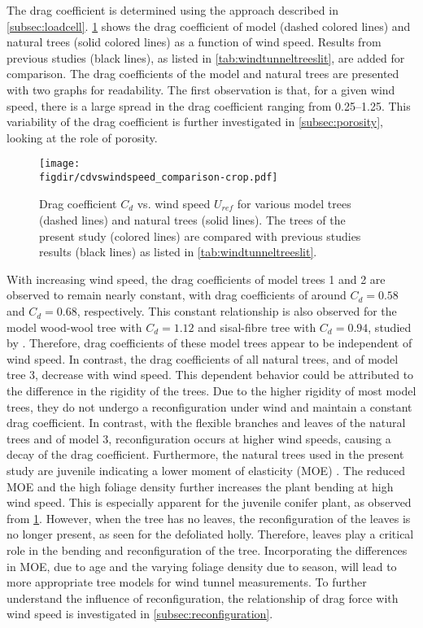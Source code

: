 The drag coefficient is determined using the approach described in \cref{subsec:loadcell}. \cref{fig:cdvswindspeed} shows the drag coefficient of model (dashed colored lines) and natural trees (solid colored lines) as a function of wind speed. Results from previous studies (black lines), as listed in \cref{tab:windtunneltreeslit}, are added for comparison. The drag coefficients of the model and natural trees are presented with two graphs for readability. The first observation is that, for a given wind speed, there is a large spread in the drag coefficient ranging from \numrange{0.25}{1.25}. This variability of the drag coefficient is further investigated in \cref{subsec:porosity}, looking at the role of porosity. 

	\begin{figure}[t]
		\centering
		\texttt{[image: \\figdir/cdvswindspeed\_comparison-crop.pdf]}
		\caption{Drag coefficient $C_d$ vs. wind speed $U_{\textit{ref}}$ for various model trees (dashed lines) and natural trees (solid lines). The trees of the present study (colored lines) are compared with previous studies results (black lines) as listed in \cref{tab:windtunneltreeslit}.}
		\label{fig:cdvswindspeed}
	\end{figure}

With increasing wind speed, the drag coefficients of model trees 1 and 2 are observed to remain nearly constant, with drag coefficients of around $C_d=0.58$ and $C_d=0.68$, respectively. This constant relationship is also observed for the model wood-wool tree with $C_d=1.12$ and sisal-fibre tree with $C_d=0.94$, studied by \cite{Gromke2008a}. Therefore, drag coefficients of these model trees appear to be independent of wind speed. In contrast, the drag coefficients of all natural trees, and of model tree 3, decrease with wind speed. This dependent behavior could be attributed to the difference in the rigidity of the trees. Due to the higher rigidity of most model trees, they do not undergo a reconfiguration under wind and maintain a constant drag coefficient. In contrast, with the flexible branches and leaves of the natural trees and of model 3, reconfiguration occurs at higher wind speeds, causing a decay of the drag coefficient. Furthermore, the natural trees used in the present study are juvenile indicating a lower moment of elasticity (MOE) \citep{Macdonald2002,Telewski1995,Watt2008}. The reduced MOE and the high foliage density further increases the plant bending at high wind speed. This is especially apparent for the juvenile conifer plant, as observed from \cref{fig:cdvswindspeed}. However, when the tree has no leaves, the reconfiguration of the leaves is no longer present, as seen for the defoliated holly. Therefore, leaves play a critical role in the bending and reconfiguration of the tree. Incorporating the differences in MOE, due to age and the varying foliage density due to season, will lead to more appropriate tree models for wind tunnel measurements. To further understand the influence of reconfiguration, the relationship of drag force with wind speed is investigated in \cref{subsec:reconfiguration}.

